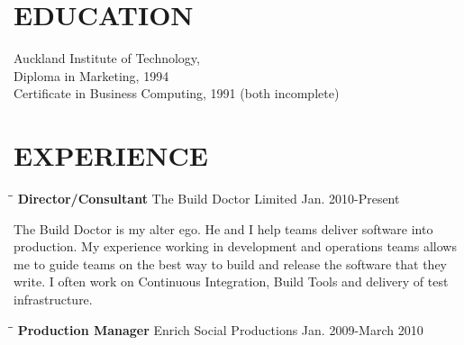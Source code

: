 \documentclass{res}
\begin{document}
 

                      
                                  
\begin{resume}

\section{EDUCATION}          
    Auckland Institute of Technology,  \\        
    Diploma in Marketing, 1994   \\       
    Certificate in Business Computing, 1991 (both incomplete) %

 
\section{EXPERIENCE}
   \vspace{-0.1in}  
   \begin{tabbing}
   \hspace{2.3in}\= \hspace{2.6in}\= \kill %
    {\bf Director/Consultant} \>The Build Doctor Limited     \>Jan. 2010-Present
   \end{tabbing}\vspace{-20pt}      %
   The Build Doctor is my alter ego. He and I help teams deliver software into production. My
experience working in development and operations teams allows me to guide teams on the best way
to build and release the software that they write. I often work on Continuous Integration, Build
Tools and delivery of test infrastructure.


   \begin{tabbing}
   \hspace{2.3in}\= \hspace{2.6in}\= \kill %
    {\bf Production Manager} \>Enrich Social Productions     \>Jan. 2009-March 2010


\end{tabbing}
\end{resume}
\end{document}
